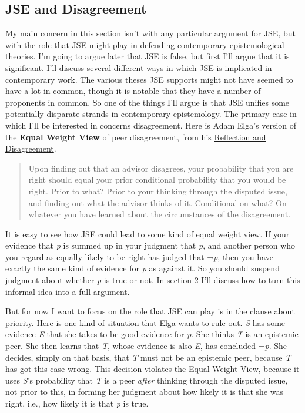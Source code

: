 \documentclass[
  10pt,
  letterpaper,
  DIV=11,
  numbers=noendperiod,
  twoside]{scrartcl}
\begin{document}
\subsection{JSE and Disagreement}\label{jse-and-disagreement}

My main concern in this section isn't with any particular argument for
JSE, but with the role that JSE might play in defending contemporary
epistemological theories. I'm going to argue later that JSE is false,
but first I'll argue that it is significant. I'll discuss several
different ways in which JSE is implicated in contemporary work. The
various theses JSE supports might not have seemed to have a lot in
common, though it is notable that they have a number of proponents in
common. So one of the things I'll argue is that JSE unifies some
potentially disparate strands in contemporary epistemology. The primary
case in which I'll be interested in concerns disagreement. Here is Adam
Elga's version of the \textbf{Equal Weight View} of peer disagreement,
from his
\href{http://philsci-archive.pitt.edu/archive/00002940/}{Reflection and
Disagreement}.

\begin{quote}
Upon finding out that an advisor disagrees, your probability that you
are right should equal your prior conditional probability that you would
be right. Prior to what? Prior to your thinking through the disputed
issue, and finding out what the advisor thinks of it. Conditional on
what? On whatever you have learned about the circumstances of the
disagreement.
\end{quote}

It is easy to see how JSE could lead to some kind of equal weight view.
If your evidence that \emph{p} is summed up in your judgment that
\emph{p}, and another person who you regard as equally likely to be
right has judged that ¬\emph{p}, then you have exactly the same kind of
evidence for \emph{p} as against it. So you should suspend judgment
about whether \emph{p} is true or not. In section 2 I'll discuss how to
turn this informal idea into a full argument.

But for now I want to focus on the role that JSE can play is in the
clause about priority. Here is one kind of situation that Elga wants to
rule out. \emph{S} has some evidence \emph{E} that she takes to be good
evidence for \emph{p}. She thinks \emph{T} is an epistemic peer. She
then learns that \emph{T}, whose evidence is also \emph{E}, has
concluded ¬\emph{p}. She decides, simply on that basis, that \emph{T}
must not be an epistemic peer, because \emph{T} has got this case wrong.
This decision violates the Equal Weight View, because it uses \emph{S}'s
probability that \emph{T} is a peer \emph{after} thinking through the
disputed issue, not prior to this, in forming her judgment about how
likely it is that she was right, i.e., how likely it is that \emph{p} is
true.
\end{document}
